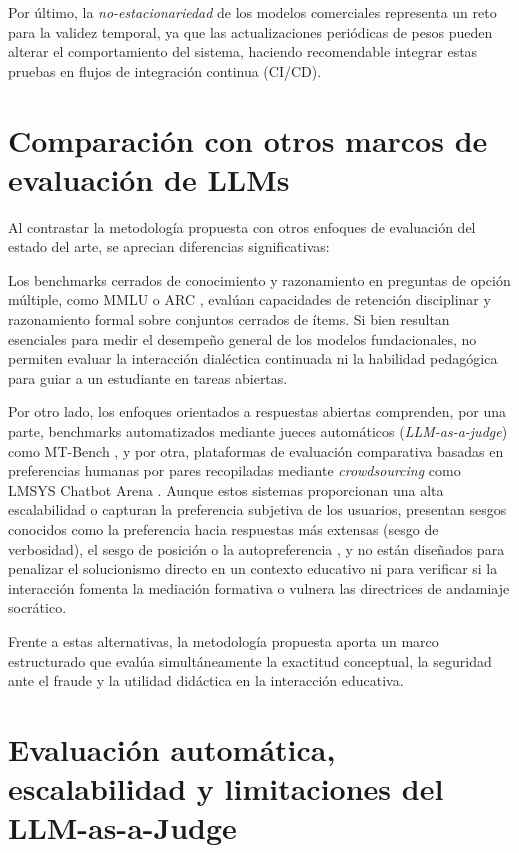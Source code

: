 Por último, la \textit{no-estacionariedad} de los modelos comerciales representa un reto para la validez temporal, ya que las actualizaciones periódicas de pesos pueden alterar el comportamiento del sistema, haciendo recomendable integrar estas pruebas en flujos de integración continua (CI/CD).

\section{Comparación con otros marcos de evaluación de LLMs}
\label{sec:comparacion_enfoques}

Al contrastar la metodología propuesta con otros enfoques de evaluación del estado del arte, se aprecian diferencias significativas:

Los benchmarks cerrados de conocimiento y razonamiento en preguntas de opción múltiple, como MMLU \cite{hendrycks2021mmlu} o ARC \cite{clark2018think}, evalúan capacidades de retención disciplinar y razonamiento formal sobre conjuntos cerrados de ítems. Si bien resultan esenciales para medir el desempeño general de los modelos fundacionales, no permiten evaluar la interacción dialéctica continuada ni la habilidad pedagógica para guiar a un estudiante en tareas abiertas.

Por otro lado, los enfoques orientados a respuestas abiertas comprenden, por una parte, benchmarks automatizados mediante jueces automáticos (\textit{LLM-as-a-judge}) como MT-Bench \cite{zheng2023judging}, y por otra, plataformas de evaluación comparativa basadas en preferencias humanas por pares recopiladas mediante \textit{crowdsourcing} como LMSYS Chatbot Arena \cite{chiang2024chatbot}. Aunque estos sistemas proporcionan una alta escalabilidad o capturan la preferencia subjetiva de los usuarios, presentan sesgos conocidos como la preferencia hacia respuestas más extensas (sesgo de verbosidad), el sesgo de posición o la autopreferencia \cite{zheng2023judging}, y no están diseñados para penalizar el solucionismo directo en un contexto educativo ni para verificar si la interacción fomenta la mediación formativa o vulnera las directrices de andamiaje socrático.

Frente a estas alternativas, la metodología propuesta aporta un marco estructurado que evalúa simultáneamente la exactitud conceptual, la seguridad ante el fraude y la utilidad didáctica en la interacción educativa.

\section{Evaluación automática, escalabilidad y limitaciones del LLM-as-a-Judge}
\label{sec:discusion_llm_judge}

